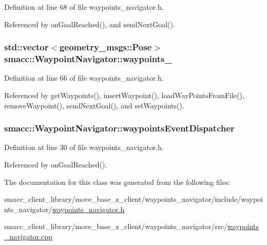 Definition at line 68 of file waypoints\+\_\+navigator.\+h.



Referenced by on\+Goal\+Reached(), and send\+Next\+Goal().

\subsubsection[{\texorpdfstring{waypoints\+\_\+}{waypoints_}}]{\setlength{\rightskip}{0pt plus 5cm}std\+::vector$<$geometry\+\_\+msgs\+::\+Pose$>$ smacc\+::\+Waypoint\+Navigator\+::waypoints\+\_\+\hspace{0.3cm}{\ttfamily [private]}}\hypertarget{classsmacc_1_1WaypointNavigator_a59d691f2177430c407b8e27df07552e9}{}\label{classsmacc_1_1WaypointNavigator_a59d691f2177430c407b8e27df07552e9}


Definition at line 66 of file waypoints\+\_\+navigator.\+h.



Referenced by get\+Waypoints(), insert\+Waypoint(), load\+Way\+Points\+From\+File(), remove\+Waypoint(), send\+Next\+Goal(), and set\+Waypoints().

\subsubsection[{\texorpdfstring{waypoints\+Event\+Dispatcher}{waypointsEventDispatcher}}]{ smacc\+::\+Waypoint\+Navigator\+::waypoints\+Event\+Dispatcher}\hypertarget{classsmacc_1_1WaypointNavigator_aab7ff616b0eba7a5ad5f03113f2de8fd}{}\label{classsmacc_1_1WaypointNavigator_aab7ff616b0eba7a5ad5f03113f2de8fd}


Definition at line 30 of file waypoints\+\_\+navigator.\+h.



Referenced by on\+Goal\+Reached().



The documentation for this class was generated from the following files\+:\begin{DoxyCompactItemize}
\item 
smacc\+\_\+client\+\_\+library/move\+\_\+base\+\_\+z\+\_\+client/waypoints\+\_\+navigator/include/waypoints\+\_\+navigator/\hyperlink{waypoints__navigator_8h}{waypoints\+\_\+navigator.\+h}\item 
smacc\+\_\+client\+\_\+library/move\+\_\+base\+\_\+z\+\_\+client/waypoints\+\_\+navigator/src/\hyperlink{waypoints__navigator_8cpp}{waypoints\+\_\+navigator.\+cpp}\end{DoxyCompactItemize}
